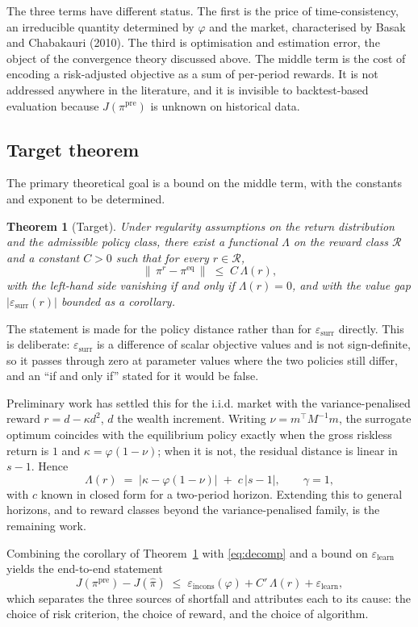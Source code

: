 \documentclass[11pt,a4paper]{article}
\theoremstyle{plain}
\newtheorem{theorem}{Theorem}
\theoremstyle{definition}
\newcommand{\pipre}{\pi^{\mathrm{pre}}}
\newcommand{\pieq}{\pi^{\mathrm{eq}}}
\newcommand{\pir}{\pi^{r}}
\newcommand{\pihat}{\widehat{\pi}}
\newcommand{\epsincons}{\varepsilon_{\mathrm{incons}}}
\newcommand{\epssurr}{\varepsilon_{\mathrm{surr}}}
\newcommand{\epslearn}{\varepsilon_{\mathrm{learn}}}
\begin{document}
The three terms have different status. The first is the price of time-consistency, an
irreducible quantity determined by $\varphi$ and the market, characterised by
Basak and Chabakauri (2010). The third is optimisation and estimation error, the object of
the convergence theory discussed above. The middle term is the cost of encoding a
risk-adjusted objective as a sum of per-period rewards. It is not addressed anywhere in
the literature, and it is invisible to backtest-based evaluation because $J(\pipre)$ is
unknown on historical data.

\subsection*{Target theorem}

The primary theoretical goal is a bound on the middle term, with the constants and
exponent to be determined.

\begin{theorem}[Target]
\label{thm:target}
Under regularity assumptions on the return distribution and the admissible policy
class, there exist a functional $\Lambda$ on the reward class $\mathcal{R}$ and a
constant $C>0$ such that for every $r\in\mathcal{R}$,
\[
\bigl\|\,\pir-\pieq\,\bigr\|\;\le\;C\,\Lambda(r),
\]
with the left-hand side vanishing if and only if $\Lambda(r)=0$, and with the
value gap $|\epssurr(r)|$ bounded as a corollary.
\end{theorem}

\noindent
The statement is made for the policy distance rather than for $\epssurr$
directly. This is deliberate: $\epssurr$ is a difference of scalar objective
values and is not sign-definite, so it passes through zero at parameter values
where the two policies still differ, and an ``if and only if'' stated for it
would be false.

Preliminary work has settled this for the i.i.d. market with the
variance-penalised reward $r=d-\kappa d^{2}$, $d$ the wealth increment. Writing
$\nu=m^{\top}M^{-1}m$, the surrogate optimum coincides with the equilibrium
policy exactly when the gross riskless return is $1$ and
$\kappa=\varphi(1-\nu)$; when it is not, the residual distance is linear in
$s-1$. Hence
\[
\Lambda(r)\;=\;\bigl|\kappa-\varphi(1-\nu)\bigr|\;+\;c\,|s-1|,
\qquad \gamma=1,
\]
with $c$ known in closed form for a two-period horizon. Extending this to
general horizons, and to reward classes beyond the variance-penalised family,
is the remaining work.

\noindent
Combining the corollary of Theorem~\ref{thm:target} with \eqref{eq:decomp} and a bound on
$\epslearn$ yields the end-to-end statement
\begin{equation}
J(\pipre)-J(\pihat)\;\le\;\epsincons(\varphi)+C'\,\Lambda(r)+\epslearn ,
\label{eq:endtoend}
\end{equation}
which separates the three sources of shortfall and attributes each to its cause: the
choice of risk criterion, the choice of reward, and the choice of algorithm.
\end{document}
